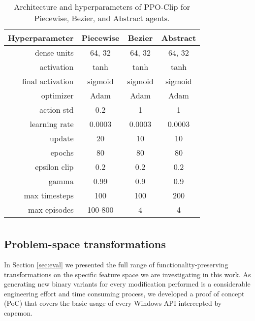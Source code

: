 \begin{table}[h]
\centering
\renewcommand*{\arraystretch}{1.05}
\begin{tabular}{|r|c|c|c|}
\toprule
\textbf{Hyperparameter} &\bf Piecewise &\bf Bezier &\bf Abstract \\
\midrule
dense units & 64, 32 & 64, 32 & 64, 32 \\
activation & tanh & tanh & tanh\\
final activation & sigmoid & sigmoid & sigmoid\\
optimizer & Adam & Adam & Adam\\
action std & 0.2 & 1 & 1\\
learning rate & 0.0003 & 0.0003 & 0.0003\\
update & 20 & 10 & 10\\
epochs & 80 & 80 & 80\\
epsilon clip & 0.2 & 0.2 & 0.2\\
gamma & 0.99 & 0.9 & 0.9\\
max timesteps & 100 & 100 & 200\\
max episodes & 100-800 & 4 & 4\\
\bottomrule
\end{tabular}
\caption{Architecture and hyperparameters of PPO-Clip for Piecewise, Bezier, and Abstract agents.}
\label{appendix:hyper}
\end{table}

\chapter{}\label{apx:autorobust}

\appendix

\section{Problem-space transformations}
\label{app:transformations}
In Section \ref{sec:eval} we presented the full range of functionality-preserving transformations on the specific feature space we are investigating in this work.
As generating new binary variants for every modification performed is a considerable engineering effort and time consuming process, we developed a proof of concept (PoC) that covers the basic usage of every Windows API intercepted by capemon.

